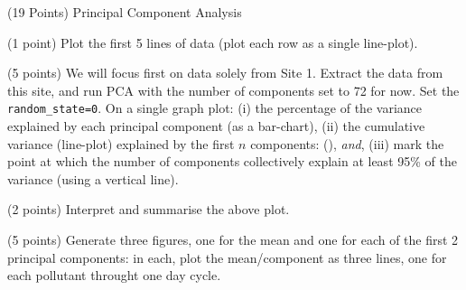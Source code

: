 \documentclass[12pt]{article}
\begin{document}
\begin{question}{(19 Points) Principal Component Analysis}




\begin{subquestion}{(1 point) Plot the first 5 lines of data (plot each row as a single line-plot).}






\end{subquestion}



\begin{subquestion}{(5 points) We will focus first on data solely from Site 1. Extract the data from this site, and run PCA with the number of components set to 72 for now. Set the \texttt{random\_state=0}. On a single graph plot: (i) the percentage of the variance explained by each principal component (as a bar-chart), (ii) the cumulative variance (line-plot) explained by the first $n$ components: (), \textsl{and}, (iii) mark the point at which the number of components collectively explain at least 95\% of the variance (using a vertical line). }






\end{subquestion}

\begin{subquestion}{(2 points) Interpret and summarise the above plot.}






\end{subquestion}


\begin{subquestion}{(5 points) Generate three figures, one for the mean and one for each of the first 2 principal components: in each, plot the mean/component as three lines, one for each pollutant throught one day cycle. }




\end{subquestion}
\end{question}
\end{document}
